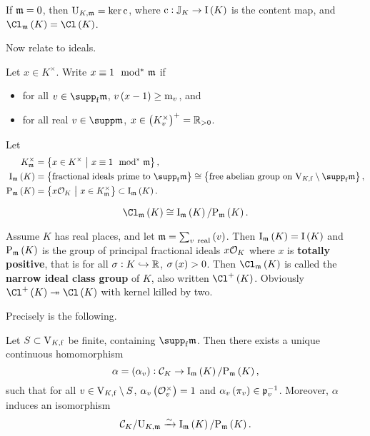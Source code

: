 \begin{example*}
If $ \mathfrak{m} = 0 $, then $ \mathrm{U}_{K, \mathfrak{m}} = \ker \mathrm{c} $, where $ \c : \JJ_K \to \I\br{K} $ is the content map, and $ \Cl_\mmm\br{K} = \Cl\br{K} $.
\end{example*}

Now relate to ideals.

\begin{notation*}
Let $ x \in K^\times $. Write $ x \equiv 1 \mod\!\!^*\  \mathfrak{m} $ if
\begin{itemize}
\item for all $ v \in \supp_\f \mmm $, $ v\br{x - 1} \ge \m_v $, and
\item for all real $ v \in \supp \mmm $, $ x \in \br{K_v^\times}^+ = \RR_{> 0} $.
\end{itemize}
Let
\begin{align*}
K_\mmm^\times & = \cbr{x \in K^\times \st x \equiv 1 \mods \mmm}, \\
\I_\mmm\br{K} & = \cbr{\text{fractional ideals prime to} \ \supp_\f \mmm} \cong \cbr{\text{free abelian group on} \ \V_{K, \f} \setminus \supp_\f \mmm}, \\
\P_\mmm\br{K} & = \cbr{x\OOO_K \st x \in K_\mmm^\times} \subset \I_\mmm\br{K}.
\end{align*}
\end{notation*}

\begin{theorem}
$$ \Cl_\mmm\br{K} \cong \I_\mmm\br{K} / \P_\mmm\br{K}. $$
\end{theorem}

\begin{example*}
Assume $ K $ has real places, and let $ \mmm = \sum_{v \ \text{real}} \br{v} $. Then $ \I_\mmm\br{K} = \I\br{K} $ and $ \P_\mmm\br{K} $ is the group of principal fractional ideals $ x\mathcal{O}_K $ where $ x $ is \textbf{totally positive}, that is for all $ \sigma : K \hookrightarrow \mathbb{R} $, $ \sigma\br{x} > 0 $. Then $ \Cl_\mmm\br{K} $ is called the \textbf{narrow ideal class group} of $ K $, also written $ \Cl^+\br{K} $. Obviously $ \Cl^+\br{K} \twoheadrightarrow \Cl\br{K} $ with kernel killed by two.
\end{example*}

Precisely is the following.

\begin{theorem}
Let $ S \subset \mathrm{V}_{K, \mathrm{f}} $ be finite, containing $ \supp_\f \mmm $. Then there exists a unique continuous homomorphism
$$ \alpha = \br{\alpha_v} : \CCC_K \to \I_\mmm\br{K} / \P_\mmm\br{K}, $$
such that for all $ v \in \mathrm{V}_{K, \mathrm{f}} \setminus S $, $ \alpha_v\br{\OOO_v^\times} = 1 $ and $ \alpha_v\br{\pi_v} \in \ppp_v^{-1} $. Moreover, $ \alpha $ induces an isomorphism
$$ \CCC_K / \U_{K, \mmm} \xrightarrow{\sim} \I_\mmm\br{K} / \P_\mmm\br{K}. $$
\end{theorem}

